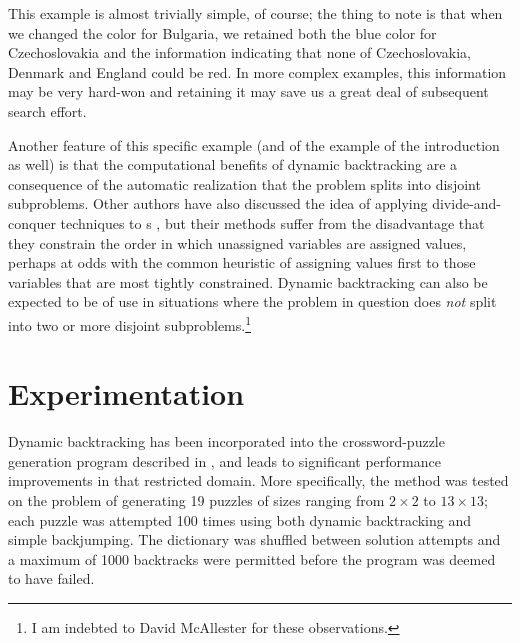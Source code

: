 This example is almost trivially simple, of course; the thing to note
is that when we changed the color for Bulgaria, we retained both the
blue color for Czechoslovakia and the information indicating that none
of Czechoslovakia, Denmark and England could be red.  In more complex
examples, this information may be very hard-won and retaining it may
save us a great deal of subsequent search effort.

Another feature of this specific example (and of the example of the
introduction as well) is that the computational benefits of dynamic
backtracking are a consequence of the automatic realization that the
problem splits into disjoint subproblems.  Other authors have also
discussed the idea of applying divide-and-conquer techniques to \csp s
\cite{Seidel:split,Zabih:split}, but their methods suffer from the
disadvantage that they constrain the order in which unassigned
variables are assigned values, perhaps at odds with the common
heuristic of assigning values first to those variables that are most
tightly constrained.  Dynamic backtracking can also be expected to be
of use in situations where the problem in question does {\em not\/}
split into two or more disjoint subproblems.\footnote{I am indebted to
David McAllester for these observations.}

\section{Experimentation}
\label{s.exp}

Dynamic backtracking has been incorporated into the crossword-puzzle
generation program described in \cite{Ginsberg:xw}, and leads to
significant performance improvements in that restricted domain.  More
specifically, the method was tested on the problem of generating 19
puzzles of sizes ranging from $2 \times 2$ to $13 \times 13$; each
puzzle was attempted 100 times using both dynamic backtracking and
simple backjumping.  The dictionary was shuffled between solution
attempts and a maximum of 1000 backtracks were permitted before the
program was deemed to have failed.

